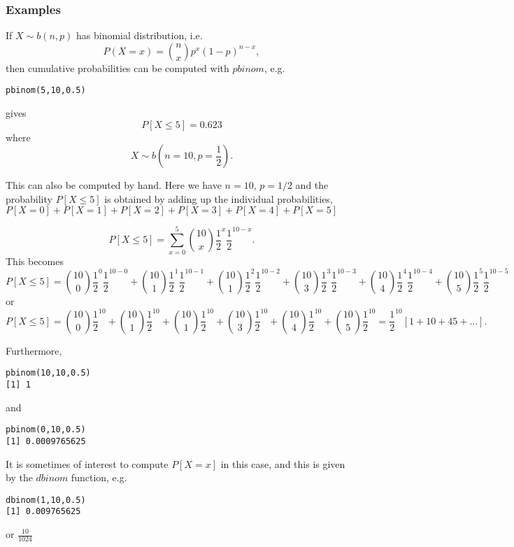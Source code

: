 \documentclass[12pt,a4paper]{article}
\theoremstyle{regla}
\theoremstyle{remark}
\theoremstyle{definition}
\theoremstyle{nonumberbreak}
\begin{document}
\subsubsection{Examples}
\begin{xmpl}

If $X \sim b(n,p)$ has binomial distribution, i.e.
$$ P(X = x) = {n \choose x}p^x(1-p)^{n-x},$$
then cumulative probabilities can be computed with $pbinom$, e.g.
\begin{lstlisting}
pbinom(5,10,0.5) 
\end{lstlisting} 

gives  $$P[X \leq 5] = 0.623$$
where $$X \sim b(n=10,p= \frac{1}{2}).$$

This can also be computed by hand. Here we have $n=10$, $p=1/2$ and the probability 
$P[X \leq 5] $ is obtained by adding up the individual probabilities, 
$P[X =0]+P[X =1]+P[X =2]+P[X =3]+P[X =4]+P[X =5]$ 

$$
P[X \leq 5]  = \sum_{x=0}^5 {10\choose x} \frac{1}{2}^x\frac{1}{2}^{10-x}.
$$
This becomes
$$
P[X \leq 5]  = {10\choose 0} \frac{1}{2}^0\frac{1}{2}^{10-0} +{10\choose 1} \frac{1}{2}^1\frac{1}{2}^{10-1}+{10\choose 1} \frac{1}{2}^2\frac{1}{2}^{10-2}+{10\choose 3} \frac{1}{2}^3\frac{1}{2}^{10-3}+{10\choose 4} \frac{1}{2}^4\frac{1}{2}^{10-4}+{10\choose 5} \frac{1}{2}^5\frac{1}{2}^{10-5}
$$
or
$$
P[X \leq 5]  = {10\choose 0} \frac{1}{2}^{10} +{10\choose 1} \frac{1}{2}^{10}+{10\choose 1} \frac{1}{2}^{10}+{10\choose 3} \frac{1}{2}^{10}+{10\choose 4} \frac{1}{2}^{10}+{10\choose 5} \frac{1}{2}^{10}=\frac{1}{2}^{10}\left[1+10+45+...\right ].
$$


Furthermore,
\begin{lstlisting} 
pbinom(10,10,0.5)
[1] 1
\end{lstlisting}
and
\begin{lstlisting} 
pbinom(0,10,0.5) 
[1] 0.0009765625
\end{lstlisting}



It is sometimes of interest to compute $P[X=x]$ in this case, and this is given by the $dbinom$ function, e.g.

\begin{lstlisting} 
dbinom(1,10,0.5)
[1] 0.009765625
\end{lstlisting}

or $ \frac{10}{1024}$

\end{xmpl}
\end{document}
